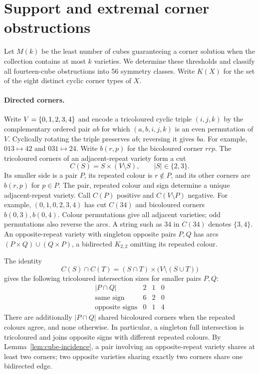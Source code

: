 \section{Support and extremal corner obstructions}\label{sec:support}
Let $M(k)$ be the least number of cubes guaranteeing a corner solution when
the collection contains at most $k$ varieties. We determine these thresholds
and classify all fourteen-cube obstructions into 56 symmetry classes. Write $K(X)$ for the set of the eight distinct cyclic corner types of $X$.

\paragraph{Directed corners.}
Write $V=\{0,1,2,3,4\}$ and encode a tricoloured cyclic triple $(i,j,k)$ by the complementary
ordered pair $ab$ for which $(a,b,i,j,k)$ is an even permutation of $V$.
Cyclically rotating the triple preserves $ab$; reversing it gives $ba$.
For example, $013\mapsto42$ and $031\mapsto24$.
Write $b(r,p)$ for the bicoloured corner $rrp$.
The tricoloured corners of an adjacent-repeat variety form a cut
\[
 C(S)=S\times(V\setminus S),\qquad |S|\in\{2,3\}.
\]
Its smaller side is a pair $P$, its repeated colour is $r\notin P$, and
its other corners are $b(r,p)$ for $p\in P$. The pair, repeated colour and
sign determine a unique adjacent-repeat variety. Call $C(P)$ positive and
$C(V\setminus P)$ negative. For example, $(0,1,0,2,3,4)$ has cut $C(34)$
and bicoloured corners $b(0,3),b(0,4)$. Colour permutations give all adjacent
varieties; odd permutations also reverse the arcs. A string such as $34$
in $C(34)$ denotes $\{3,4\}$.
An opposite-repeat variety with singleton opposite pairs $P,Q$ has arcs
$(P\times Q)\cup(Q\times P)$, a bidirected $K_{2,2}$ omitting its repeated
colour.

The identity
\[
 C(S)\cap C(T)=(S\cap T)\times\bigl(V\setminus(S\cup T)\bigr)
\]
gives the following tricoloured intersection sizes for smaller pairs $P,Q$:
\[
\begin{array}{c|ccc}
 |P\cap Q|&2&1&0\\\hline
 \text{same sign}&6&2&0\\
 \text{opposite signs}&0&1&4
\end{array}
\]
There are additionally $|P\cap Q|$ shared bicoloured corners when the
repeated colours agree, and none otherwise. In particular, a singleton
full intersection is tricoloured and joins opposite signs with different
repeated colours. By Lemma~\ref{lem:cube-incidence}, a pair involving an
opposite-repeat variety shares at least two corners; two opposite varieties
sharing exactly two corners share one bidirected edge.

